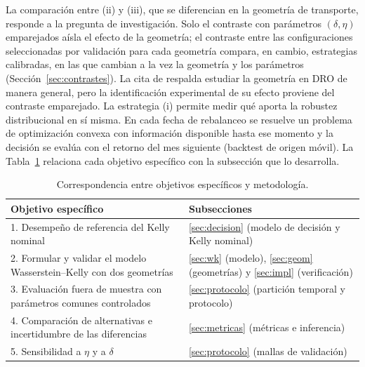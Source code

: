 La comparación entre (ii) y (iii), que se diferencian en la geometría de transporte, responde a la pregunta de investigación. Solo el contraste con parámetros $(\delta,\eta)$ emparejados aísla el efecto de la geometría; el contraste entre las configuraciones seleccionadas por validación para cada geometría compara, en cambio, estrategias calibradas, en las que cambian a la vez la geometría y los parámetros (Sección~\ref{sec:contrastes}). La cita de \citet{liu2022} respalda estudiar la geometría en DRO de manera general, pero la identificación experimental de su efecto proviene del contraste emparejado. La estrategia (i) permite medir qué aporta la robustez distribucional en sí misma.
 En cada fecha de rebalanceo se resuelve un problema de optimización convexa con información disponible hasta ese momento y la decisión se evalúa con el retorno del mes siguiente (backtest de origen móvil). La Tabla~\ref{tab:objetivos} relaciona cada objetivo específico con la subsección que lo desarrolla.

\begin{table}[h]
\centering
\caption{Correspondencia entre objetivos específicos y metodología.}\label{tab:objetivos}
\begin{tabular}{|p{6.3cm}|p{8.7cm}|}
\hline
\textbf{Objetivo específico} & \textbf{Subsecciones} \\ \hline
1. Desempeño de referencia del Kelly nominal & \ref{sec:decision} (modelo de decisión y Kelly nominal) \\ \hline
2. Formular y validar el modelo Wasserstein--Kelly con dos geometrías & \ref{sec:wk} (modelo), \ref{sec:geom} (geometrías) y \ref{sec:impl} (verificación) \\ \hline
3. Evaluación fuera de muestra con parámetros comunes controlados & \ref{sec:protocolo} (partición temporal y protocolo) \\ \hline
4. Comparación de alternativas e incertidumbre de las diferencias & \ref{sec:metricas} (métricas e inferencia) \\ \hline
5. Sensibilidad a $\eta$ y a $\delta$ & \ref{sec:protocolo} (mallas de validación) \\ \hline
\end{tabular}
\end{table}

